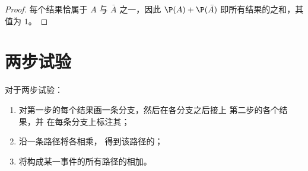 \begin{proof}
每个结果恰属于 $A$ 与 $\bar A$ 之一，因此
$\P(A) + \P(\bar A)$ 即所有结果的之和，其值为
$1$。
\end{proof}

\section{两步试验}

\begin{method}[树状图]\label{met:g9:statproba:tree}
对于两步试验：
\begin{enumerate}
  \item 对第一步的每个结果画一条分支，然后在各分支之后接上
        第二步的各个结果，并
        在每条分支上标注其；
  \item 沿一条路径将各相乘，
        得到该路径的；
  \item 将构成某一事件的所有路径的相加。
\end{enumerate}
\end{method}

